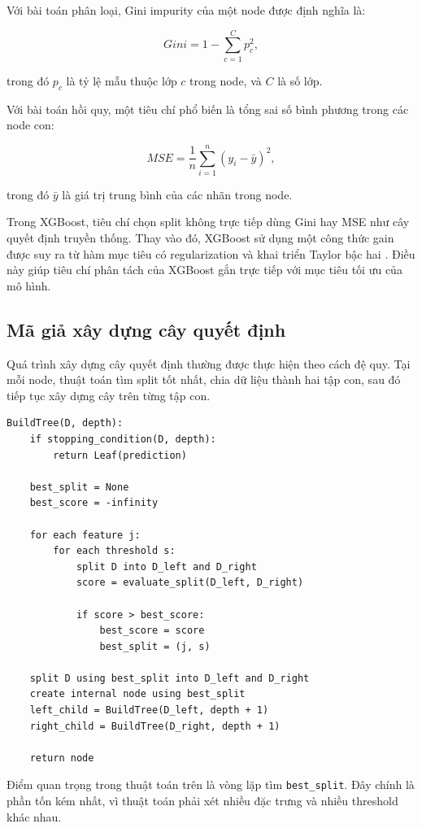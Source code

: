 Với bài toán phân loại, Gini impurity của một node được định nghĩa là:

\[
Gini = 1 - \sum_{c=1}^{C} p_c^2,
\]

trong đó $p_c$ là tỷ lệ mẫu thuộc lớp $c$ trong node, và $C$ là số lớp.

Với bài toán hồi quy, một tiêu chí phổ biến là tổng sai số bình phương trong các node con:

\[
MSE = \frac{1}{n}\sum_{i=1}^{n}(y_i - \bar{y})^2,
\]

trong đó $\bar{y}$ là giá trị trung bình của các nhãn trong node.

Trong XGBoost, tiêu chí chọn split không trực tiếp dùng Gini hay MSE như cây quyết định truyền thống. Thay vào đó, XGBoost sử dụng một công thức gain được suy ra từ hàm mục tiêu có regularization và khai triển Taylor bậc hai \cite{chen2016xgboost}. Điều này giúp tiêu chí phân tách của XGBoost gắn trực tiếp với mục tiêu tối ưu của mô hình.

\subsection{Mã giả xây dựng cây quyết định}

Quá trình xây dựng cây quyết định thường được thực hiện theo cách đệ quy. Tại mỗi node, thuật toán tìm split tốt nhất, chia dữ liệu thành hai tập con, sau đó tiếp tục xây dựng cây trên từng tập con.

\begin{lstlisting}[style=pseudocode, caption={Mã giả xây dựng cây quyết định}, label={lst:decision_tree}]
BuildTree(D, depth):
    if stopping_condition(D, depth):
        return Leaf(prediction)

    best_split = None
    best_score = -infinity

    for each feature j:
        for each threshold s:
            split D into D_left and D_right
            score = evaluate_split(D_left, D_right)

            if score > best_score:
                best_score = score
                best_split = (j, s)

    split D using best_split into D_left and D_right
    create internal node using best_split
    left_child = BuildTree(D_left, depth + 1)
    right_child = BuildTree(D_right, depth + 1)

    return node
\end{lstlisting}

Điểm quan trọng trong thuật toán trên là vòng lặp tìm \texttt{best\_split}. Đây chính là phần tốn kém nhất, vì thuật toán phải xét nhiều đặc trưng và nhiều threshold khác nhau.

